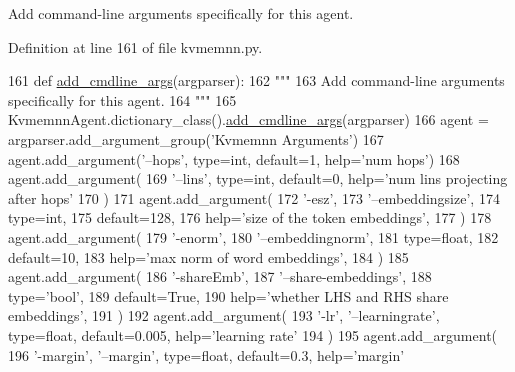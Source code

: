 \begin{DoxyVerb}Add command-line arguments specifically for this agent.
\end{DoxyVerb}
 

Definition at line 161 of file kvmemnn.\+py.


\begin{DoxyCode}
161     \textcolor{keyword}{def }\hyperlink{namespaceparlai_1_1agents_1_1drqa_1_1config_a62fdd5554f1da6be0cba185271058320}{add\_cmdline\_args}(argparser):
162         \textcolor{stringliteral}{"""}
163 \textcolor{stringliteral}{        Add command-line arguments specifically for this agent.}
164 \textcolor{stringliteral}{        """}
165         KvmemnnAgent.dictionary\_class().\hyperlink{namespaceparlai_1_1agents_1_1drqa_1_1config_a62fdd5554f1da6be0cba185271058320}{add\_cmdline\_args}(argparser)
166         agent = argparser.add\_argument\_group(\textcolor{stringliteral}{'Kvmemnn Arguments'})
167         agent.add\_argument(\textcolor{stringliteral}{'--hops'}, type=int, default=1, help=\textcolor{stringliteral}{'num hops'})
168         agent.add\_argument(
169             \textcolor{stringliteral}{'--lins'}, type=int, default=0, help=\textcolor{stringliteral}{'num lins projecting after hops'}
170         )
171         agent.add\_argument(
172             \textcolor{stringliteral}{'-esz'},
173             \textcolor{stringliteral}{'--embeddingsize'},
174             type=int,
175             default=128,
176             help=\textcolor{stringliteral}{'size of the token embeddings'},
177         )
178         agent.add\_argument(
179             \textcolor{stringliteral}{'-enorm'},
180             \textcolor{stringliteral}{'--embeddingnorm'},
181             type=float,
182             default=10,
183             help=\textcolor{stringliteral}{'max norm of word embeddings'},
184         )
185         agent.add\_argument(
186             \textcolor{stringliteral}{'-shareEmb'},
187             \textcolor{stringliteral}{'--share-embeddings'},
188             type=\textcolor{stringliteral}{'bool'},
189             default=\textcolor{keyword}{True},
190             help=\textcolor{stringliteral}{'whether LHS and RHS share embeddings'},
191         )
192         agent.add\_argument(
193             \textcolor{stringliteral}{'-lr'}, \textcolor{stringliteral}{'--learningrate'}, type=float, default=0.005, help=\textcolor{stringliteral}{'learning rate'}
194         )
195         agent.add\_argument(
196             \textcolor{stringliteral}{'-margin'}, \textcolor{stringliteral}{'--margin'}, type=float, default=0.3, help=\textcolor{stringliteral}{'margin'}

\end{DoxyCode}
